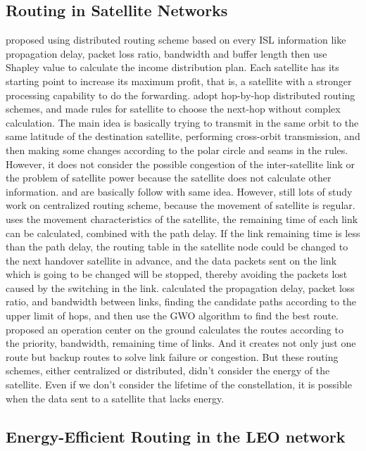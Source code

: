 \subsection{Routing in Satellite Networks}
\cite{INCOME} proposed using distributed routing scheme based on every ISL information like propagation delay, packet loss ratio, bandwidth and buffer length then use Shapley value to calculate the income distribution plan. Each satellite has its starting point to increase its maximum profit, that is, a satellite with a stronger processing capability to do the forwarding. \cite{LCD1} adopt hop-by-hop distributed routing schemes, and made rules for satellite to choose the next-hop without complex calculation. The main idea is basically trying to transmit in the same orbit to the same latitude of the destination satellite, performing cross-orbit transmission, and then making some changes according to the polar circle and seams in the rules. However, it does not consider the possible congestion of the inter-satellite link or the problem of satellite power because the satellite does not calculate other information. \cite{LCD2} and \cite{LCD3} are basically follow with same idea. However, still lots of study work on centralized routing scheme, because the movement of satellite is regular. \cite{CHARACTERISTICS} uses the movement characteristics of the satellite, the remaining time of each link can be calculated, combined with the path delay. If the link remaining time is less than the path delay, the routing table in the satellite node could be changed to the next handover satellite in advance, and the data packets sent on the link which is going to be changed will be stopped, thereby avoiding the packets lost caused by the switching in the link. \cite{LOWTRACK} calculated the propagation delay, packet loss ratio, and bandwidth between links, finding the candidate paths according to the upper limit of hops, and then use the GWO algorithm to find the best route. \cite{PRIORITY} proposed an operation center on the ground calculates the routes according to the priority, bandwidth, remaining time of links. And it creates not only just one route but backup routes to solve link failure or congestion. But these routing schemes, either centralized or distributed, didn’t consider the energy of the satellite. Even if we don't consider the lifetime of the constellation, it is possible when the data sent to a satellite that lacks energy.


\subsection{Energy-Efficient Routing in the LEO network}

